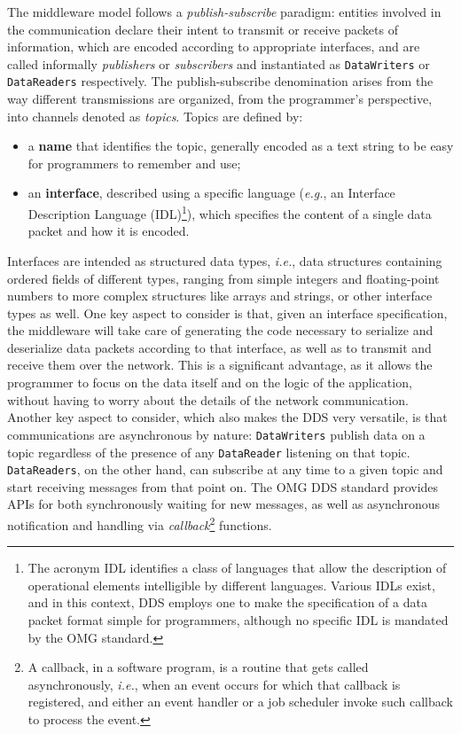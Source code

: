 The middleware model follows a \emph{publish-subscribe} paradigm: entities involved in the communication declare their intent to transmit or receive packets of information, which are encoded according to appropriate interfaces, and are called informally \emph{publishers} or \emph{subscribers} and instantiated as \texttt{DataWriters} or \texttt{DataReaders} respectively. The publish-subscribe denomination arises from the way different transmissions are organized, from the programmer's perspective, into channels denoted as \emph{topics}. Topics are defined by:
\begin{itemize}
  \item a \textbf{name} that identifies the topic, generally encoded as a text string to be easy for programmers to remember and use;
  \item an \textbf{interface}, described using a specific language (\emph{e.g.}, an Interface Description Language (IDL)\footnote{The acronym IDL identifies a class of languages that allow the description of operational elements intelligible by different languages. Various IDLs exist, and in this context, DDS employs one to make the specification of a data packet format simple for programmers, although no specific IDL is mandated by the OMG standard.}), which specifies the content of a single data packet and how it is encoded.
\end{itemize}
Interfaces are intended as structured data types, \emph{i.e.}, data structures containing ordered fields of different types, ranging from simple integers and floating-point numbers to more complex structures like arrays and strings, or other interface types as well. One key aspect to consider is that, given an interface specification, the middleware will take care of generating the code necessary to serialize and deserialize data packets according to that interface, as well as to transmit and receive them over the network. This is a significant advantage, as it allows the programmer to focus on the data itself and on the logic of the application, without having to worry about the details of the network communication. Another key aspect to consider, which also makes the DDS very versatile, is that communications are asynchronous by nature: \texttt{DataWriters} publish data on a topic regardless of the presence of any \texttt{DataReader} listening on that topic. \texttt{DataReaders}, on the other hand, can subscribe at any time to a given topic and start receiving messages from that point on. The OMG DDS standard provides APIs for both synchronously waiting for new messages, as well as asynchronous notification and handling via \emph{callback}\footnote{A callback, in a software program, is a routine that gets called asynchronously, \emph{i.e.}, when an event occurs for which that callback is registered, and either an event handler or a job scheduler invoke such callback to process the event.} functions.

